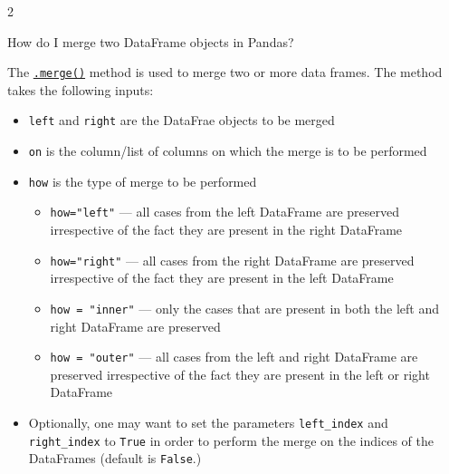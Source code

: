 \documentclass[a4paper,11pt]{book}
\newcommand{\question}[1]{%
    \begin{tcolorbox}[colback=comp_c!10,colframe=comp_c,sidebyside align=top,width=\linewidth,before skip=1ex]
        #1
    \end{tcolorbox}
    \switchcolumn%
}
\newcommand{\note}[1]{%
    \begin{tcolorbox}[colback=white!0,colframe=white!10,width=\linewidth,before skip=1ex]
        #1
    \end{tcolorbox}
}
\begin{document}
\begin{paracol}{2}
	\question{\raggedright How do I merge two DataFrame objects in Pandas?}
	\note{The \href{https://pandas.pydata.org/docs/reference/api/pandas.merge.html?highlight=merge\#pandas.merge}{\texttt{.merge()}} method is used to merge two or more data frames. The method takes the following inputs:
	
	\begin{itemize}
		\item \texttt{left} and \texttt{right} are the DataFrae objects to be merged
		\item \texttt{on} is the column/list of columns on which the merge is to be performed
		\item \texttt{how} is the type of merge to be performed
		\begin{itemize}
			\item \texttt{how="left"} --- all cases from the left DataFrame are preserved irrespective of the fact they are present in the right DataFrame
			\item \texttt{how="right"} --- all cases from the right DataFrame are preserved irrespective of the fact they are present in the left DataFrame
			\item \texttt{how = "inner"} --- only the cases that are present in both the left and right DataFrame are preserved
			\item \texttt{how = "outer"} --- all cases from the left and right DataFrame are preserved irrespective of the fact they are present in the left or right DataFrame
		\end{itemize}
		\item Optionally, one may want to set the parameters \texttt{left\_index} and \texttt{right\_index} to \texttt{True} in order to perform the merge on the indices of the DataFrames (default is \texttt{False}.)
	\end{itemize}
	}
\end{paracol}
\clearpage
\end{document}
